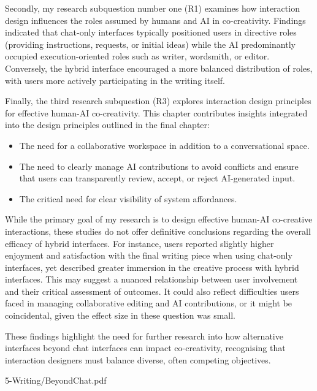 Secondly, my research subquestion number one (R1) examines how interaction design influences the roles assumed by humans and AI in co-creativity. Findings indicated that chat-only interfaces typically positioned users in directive roles (providing instructions, requests, or initial ideas) while the AI predominantly occupied execution-oriented roles such as writer, wordsmith, or editor. Conversely, the hybrid interface encouraged a more balanced distribution of roles, with users more actively participating in the writing itself.

Finally, the third research subquestion (R3) explores interaction design principles for effective human-AI co-creativity. This chapter contributes insights integrated into the design principles outlined in the final chapter:

\begin{itemize}
    \item The need for a collaborative workspace in addition to a conversational space.
    \item The need to clearly manage AI contributions to avoid conflicts and ensure that users can transparently review, accept, or reject AI-generated input.
    \item The critical need for clear visibility of system affordances.
\end{itemize}

While the primary goal of my research is to design effective human-AI co-creative interactions, these studies do not offer definitive conclusions regarding the overall efficacy of hybrid interfaces. For instance, users reported slightly higher enjoyment and satisfaction with the final writing piece when using chat-only interfaces, yet described greater immersion in the creative process with hybrid interfaces. This may suggest a nuanced relationship between user involvement and their critical assessment of outcomes. It could also reflect difficulties users faced in managing collaborative editing and AI contributions, or it might be coincidental, given the effect size in these question was small.

These findings highlight the need for further research into how alternative interfaces beyond chat interfaces can impact co-creativity, recognising that interaction designers must balance diverse, often competing objectives.


{5-Writing/BeyondChat.pdf}
